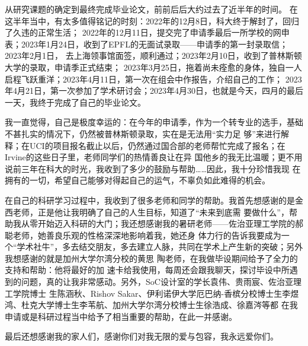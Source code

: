 
\begin{acknowledgements}

从研究课题的确定到最终完成毕业论文，前前后后大约过去了近半年的时间。
在这半年当中，有太多值得铭记的时刻：2022年的12月8日，科大终于解封了，回归了久违的正常生活；
2022年的12月11日，提交完了申请季最后一所学校的网申表；2023年1月24日，收到了EPFL的无面试录取——申请季的第一封录取信；2023年2月1日，
去上海领事馆面签，顺利通过；2023年2月10日，收到了普林斯顿大学的录取，申请季正式结束；
2023年3月25日，拖着尚未痊愈的身体，独自一人启程飞跃重洋；2023年4月11日，第一次在组会中作报告，介绍自己的工作；
2023年4月21日，第一次参加了学术研讨会；2023年4月30日，也就是今天，四月的最后一天，我终于完成了自己的毕业论文。

我一直觉得，自己是极度幸运的：在今年的申请季，作为一个转专业的选手，基础不甚扎实的情况下，仍然被普林斯顿录取，实在是无法用“实力足
够”来进行解释；在UCI的项目报名截止以后，仍然通过国合部的老师帮忙完成了报名；在Irvine的这些日子里，老师同学们的热情善良让在异
国他乡的我无比温暖；更不用说前三年在科大的时光，我收到了多少的鼓励与帮助……因此，我十分珍惜我现
在拥有的一切，希望自己能够对得起自己的运气，不辜负如此难得的机会。

在自己的科研学习过程中，我收到了很多老师和同学的帮助。我首先想感谢的是金西老师，正是他让我明确了自己的人生目标，知道了“未来到底需
要做什么”，帮助我从零开始迈入科研的大门；我还想感谢我的暑研老师——佐治亚理工学院的郝聪老师，她善良乐观的性格深深地影响着我，她还身
体力行的告诉我要成为一个“学术社牛”，多去结交朋友，多去建立人脉，共同在学术上产生新的突破；另外我想感谢的就是加州大学尔湾分校的黄思
陶老师，在我做毕设期间给予了全力的支持和帮助：他将最好的加
速卡给我使用，每周还会跟我聊天，探讨毕设中所遇到的问题，真的让我非常感动。另外，SoC设计室的学长袁伟、贵雨宸、佐治亚理工学院博士
生陈涵秋、Rishov Sakar、伊利诺伊大学厄巴纳-香槟分校博士生李煜鸿、杜克大学博士生李苇航、加州大学尔湾分校博士生徐浩成、徐嘉涔等都
在我申请或是科研过程当中给予了相当重要的帮助，在此一并感谢。

最后还想感谢我的家人们，感谢你们对我无限的爱与包容，我永远爱你们。

\end{acknowledgements}
